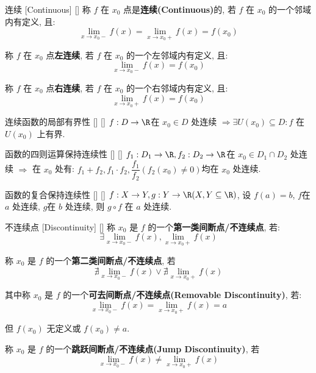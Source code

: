 \documentclass[UTF8]{ctexart}
\begin{document}
			\begin{dfn}
			    []
			    {连续}
			    [Continuous]
			    []
				称 \(f\) 在 \(x_0\) 点是\textbf{连续(Continuous)}的, 若 \(f\) 在 \(x_0\) 的一个邻域内有定义, 且: 
				\[\lim_{x\to x_0-}f(x)=\lim_{x\to x_0+}f(x)=f(x_0)\]
				
				称 \(f\) 在 \(x_0\) 点\textbf{左连续}, 若 \(f\) 在 \(x_0\) 的一个左邻域内有定义, 且: 
				\[\lim_{x\to x_0-}f(x)=f(x_0)\]
				
				称 \(f\) 在 \(x_0\) 点\textbf{右连续}, 若 \(f\) 在 \(x_0\) 的一个右邻域内有定义, 且: 
				\[\lim_{x\to x_0+}f(x)=f(x_0)\]
			\end{dfn}

			\begin{ppt}
			    []
			    {连续函数的局部有界性}
			    []
			    []
				\(f:D\to\R\)在 \(x_0\in D\) 处连续 \(\Longrightarrow\exists U(x_0)\subseteq D: f\) 在 \(U(x_0)\) 上有界. 
			\end{ppt}

			\begin{ppt}
			    []
			    {函数的四则运算保持连续性}
			    []
			    []
				\(f_1:D_1\to\R,f_2:D_2\to\R\)在 \(x_0\in D_1\cap D_2\) 处连续 \(\Longrightarrow\) 在 \(x_0\) 处有: 
				\(f_1+f_2,f_1\cdot f_2,\dfrac{f_1}{f_2}(f_2(x_0)\neq 0)\)均在 \(x_0\) 处连续. 
			\end{ppt}
			
			\begin{ppt}
			    []
			    {函数的复合保持连续性}
			    []
			    []
				\(f:X\to Y,g:Y\to\R(X,Y\subseteq\R)\), 设 \(f(a)=b\), \(f\)在 \(a\) 处连续, \(g\)在 \(b\) 处连续, 则 \(g\circ f\) 在 \(a\) 处连续. 
			\end{ppt}
			
			\begin{dfn}
			    []
			    {不连续点}
			    [Discontinuity]
			    []
				称 \(x_0\) 是 \(f\) 的一个\textbf{第一类间断点/不连续点}, 若: 
				\[\exists\lim_{x\to x_0-}f(x), \lim_{x\to x_0+}f(x)\]
				
				称 \(x_0\) 是 \(f\) 的一个\textbf{第二类间断点/不连续点}, 若
				\[\nexists\lim_{x\to x_0-}f(x)\vee\nexists\lim_{x\to x_0+}f(x)\]
				
				其中称 \(x_0\) 是 \(f\) 的一个\textbf{可去间断点/不连续点(Removable Discontinuity)}, 若: 
				\[\lim_{x\to x_0-}f(x)=\lim_{x\to x_0+}f(x)=a\]
				
				但 \(f(x_0)\) 无定义或 \(f(x_0)\neq a\). 
				
				称 \(x_0\) 是 \(f\) 的一个\textbf{跳跃间断点/不连续点(Jump Discontinuity)}, 若
				\[\lim_{x\to x_0-}f(x)\neq\lim_{x\to x_0+}f(x)\]
			\end{dfn}
			
\end{document}

